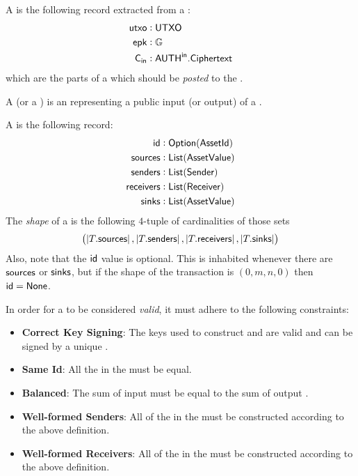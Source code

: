 \begin{definition}
    A \ReceiverPost{} is the following record extracted from a \Receiver{}:
    \begin{align*}
        {\textsf{utxo}} &: {\textsf{UTXO}} \\
        {\textsf{epk}}  &: {\mathbb{G}} \\
        {\textsf{C}_\textsf{in}}  &: {{\textsf{AUTH}}^\textsf{in}}.{\textsf{Ciphertext}}
    \end{align*}
    which are the parts of a \Receiver{} which should be \emph{posted} to the \Ledger{}.
\end{definition}

\begin{definition}
    A \Source{} (or a \Sink{}) is an \Asset{} representing a public input (or output) of a \Transfer{}.
\end{definition}

\begin{definition}
    A \Transfer{} is the following record:
    \begin{align*}
        {\textsf{id}}        &: {\textsf{Option}}({\textsf{AssetId}}) \\
        {\textsf{sources}}   &: {\textsf{List}}({\textsf{AssetValue}}) \\
        {\textsf{senders}}   &: {\textsf{List}}({\textsf{Sender}}) \\
        {\textsf{receivers}} &: {\textsf{List}}({\textsf{Receiver}}) \\
        {\textsf{sinks}}     &: {\textsf{List}}({\textsf{AssetValue}})
    \end{align*}
    The \emph{shape} of a \Transfer{} is the following $4$-tuple of cardinalities of those sets
    \[\left(\left|T.{\textsf{sources}}\right|, \left|T.{\textsf{senders}}\right|, \left|T.{\textsf{receivers}}\right|, \left|T.{\textsf{sinks}}\right|\right)\]
    Also, note that the ${\textsf{id}}$ value is optional. This is inhabited whenever there are ${\textsf{sources}}$ or ${\textsf{sinks}}$, but if the shape of the transaction is $(0, m, n, 0)$ then ${\textsf{id}} = {\textsf{None}}$.
\end{definition}

In order for a \Transfer{} to be considered \emph{valid}, it must adhere to the following constraints:

\begin{itemize}
    \item \textbf{Correct Key Signing}: The keys used to construct  and  are valid and can be signed by a unique \SpendingKey{}.
    \item \textbf{Same Id}: All the  in the \Transfer{} must be equal.
    \item \textbf{Balanced}: The sum of input  must be equal to the sum of output .
    \item \textbf{Well-formed Senders}: All of the  in the \Transfer{} must be constructed according to the above \Sender{} definition.
    \item \textbf{Well-formed Receivers}: All of the  in the \Transfer{} must be constructed according to the above \Receiver{} definition.
\end{itemize}

